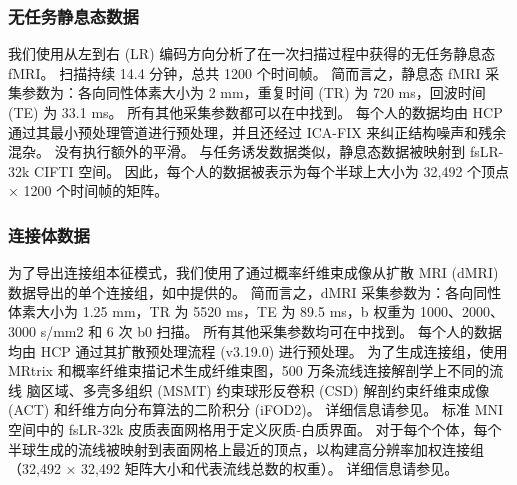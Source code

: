 \documentclass[lang=cn,a4paper,newtx]{elegantpaper}
\begin{document}
\subsubsection{无任务静息态数据}
我们使用从左到右 (LR) 编码方向分析了在一次扫描过程中获得的无任务静息态 fMRI。
扫描持续 14.4 分钟，总共 1200 个时间帧。
简而言之，静息态 fMRI 采集参数为：各向同性体素大小为 2 mm，重复时间 (TR) 为 720 ms，回波时间 (TE) 为 33.1 ms。
所有其他采集参数都可以在\cite{van2013wu}中找到。
每个人的数据均由 HCP 通过其最小预处理管道进行预处理\cite{glasser2013minimal}，并且还经过 ICA-FIX 来纠正结构噪声和残余混杂\cite{salimi2014automatic}。
没有执行额外的平滑。
与任务诱发数据类似，静息态数据被映射到 fsLR-32k CIFTI 空间。
因此，每个人的数据被表示为每个半球上大小为 32,492 个顶点 × 1200 个时间帧的矩阵。


\subsubsection{连接体数据}

为了导出连接组本征模式，我们使用了通过概率纤维束成像从扩散 MRI (dMRI) 数据导出的单个连接组，如\cite{tian2021high}中提供的。
简而言之，dMRI 采集参数为：各向同性体素大小为 1.25 mm，TR 为 5520 ms，TE 为 89.5 ms，b 权重为 1000、2000、3000 s/mm2 和 6 次 b0 扫描。
所有其他采集参数均可在\cite{van2013wu}中找到。
每个人的数据均由 HCP 通过其扩散预处理流程 (v3.19.0) \cite{glasser2013minimal}进行预处理。
为了生成连接组，使用 MRtrix 和概率纤维束描记术生成纤维束图，500 万条流线连接解剖学上不同的流线 脑区域、多壳多组织 (MSMT) 约束球形反卷积 (CSD) 解剖约束纤维束成像 (ACT) 和纤维方向分布算法的二阶积分 (iFOD2)。
详细信息请参见\cite{tian2021high}。
标准 MNI 空间中的 fsLR-32k 皮质表面网格用于定义灰质-白质界面。
对于每个个体，每个半球生成的流线被映射到表面网格上最近的顶点，以构建高分辨率加权连接组（32,492 × 32,492 矩阵大小和代表流线总数的权重）。
详细信息请参见\cite{tian2021high}。
\end{document}

